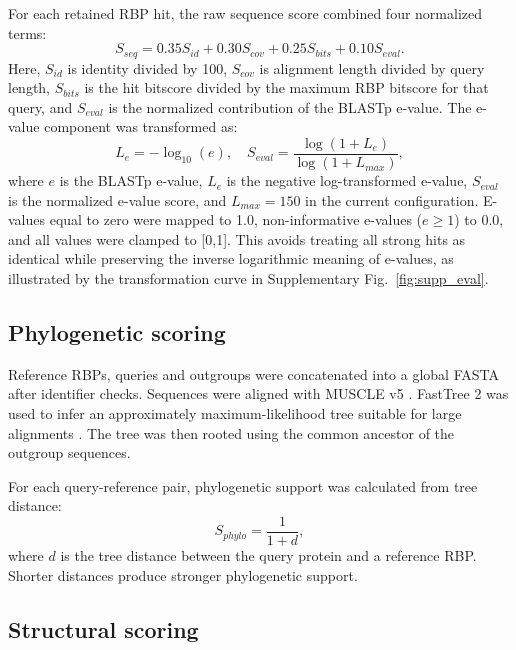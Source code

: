 \documentclass[runningheads]{llncs}
\begin{document}
For each retained RBP hit, the raw sequence score combined four normalized terms:
\begin{equation}
S_{seq}=0.35S_{id}+0.30S_{cov}+0.25S_{bits}+0.10S_{eval}.
\end{equation}
Here, $S_{id}$ is identity divided by 100, $S_{cov}$ is alignment length divided by query length, $S_{bits}$ is the hit bitscore divided by the maximum RBP bitscore for that query, and $S_{eval}$ is the normalized contribution of the BLASTp e-value. The e-value component was transformed as:
\begin{equation}
L_e=-\log_{10}(e),\quad S_{eval}=\frac{\log(1+L_e)}{\log(1+L_{max})},
\end{equation}
where $e$ is the BLASTp e-value, $L_e$ is the negative log-transformed e-value, $S_{eval}$ is the normalized e-value score, and $L_{max}=150$ in the current configuration. E-values equal to zero were mapped to 1.0, non-informative e-values ($e\geq1$) to 0.0, and all values were clamped to [0,1]. This avoids treating all strong hits as identical while preserving the inverse logarithmic meaning of e-values, as illustrated by the transformation curve in Supplementary Fig.~\ref{fig:supp_eval}.

\subsection{Phylogenetic scoring}

Reference RBPs, queries and outgroups were concatenated into a global FASTA after identifier checks. Sequences were aligned with MUSCLE v5 \cite{edgar2022}. FastTree 2 was used to infer an approximately maximum-likelihood tree suitable for large alignments \cite{price2010}. The tree was then rooted using the common ancestor of the outgroup sequences.

For each query-reference pair, phylogenetic support was calculated from tree distance:
\begin{equation}
S_{phylo}=\frac{1}{1+d},
\end{equation}
where $d$ is the tree distance between the query protein and a reference RBP. Shorter distances produce stronger phylogenetic support.

\subsection{Structural scoring}
\end{document}
